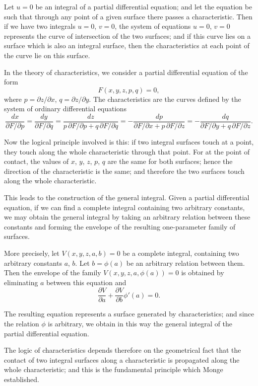 \documentclass[11pt,a4paper]{book}
\begin{document}
Let $u=0$ be an integral of a partial differential equation; and let the equation be such that through any point of a given surface there passes a characteristic. Then if we have two integrals $u=0$, $v=0$, the system of equations $u=0$, $v=0$ represents the curve of intersection of the two surfaces; and if this curve lies on a surface which is also an integral surface, then the characteristics at each point of the curve lie on this surface.

In the theory of characteristics, we consider a partial differential equation of the form
\[
F(x,y,z,p,q) = 0,
\]
where $p=\partial z/\partial x$, $q=\partial z/\partial y$. The characteristics are the curves defined by the system of ordinary differential equations
\[
\frac{dx}{\partial F/\partial p}
= \frac{dy}{\partial F/\partial q}
= \frac{dz}{p\,\partial F/\partial p + q\,\partial F/\partial q}
= -\frac{dp}{\partial F/\partial x + p\,\partial F/\partial z}
= -\frac{dq}{\partial F/\partial y + q\,\partial F/\partial z}.
\]

Now the logical principle involved is this: if two integral surfaces touch at a point, they touch along the whole characteristic through that point. For at the point of contact, the values of $x$, $y$, $z$, $p$, $q$ are the same for both surfaces; hence the direction of the characteristic is the same; and therefore the two surfaces touch along the whole characteristic.

This leads to the construction of the general integral. Given a partial differential equation, if we can find a complete integral containing two arbitrary constants, we may obtain the general integral by taking an arbitrary relation between these constants and forming the envelope of the resulting one-parameter family of surfaces.

More precisely, let $V(x,y,z,a,b)=0$ be a complete integral, containing two arbitrary constants $a$, $b$. Let $b=\phi(a)$ be an arbitrary relation between them. Then the envelope of the family $V(x,y,z,a,\phi(a))=0$ is obtained by eliminating $a$ between this equation and
\[
\frac{\partial V}{\partial a} + \frac{\partial V}{\partial b}\phi'(a) = 0.
\]

The resulting equation represents a surface generated by characteristics; and since the relation $\phi$ is arbitrary, we obtain in this way the general integral of the partial differential equation.

The logic of characteristics depends therefore on the geometrical fact that the contact of two integral surfaces along a characteristic is propagated along the whole characteristic; and this is the fundamental principle which Monge established.
\end{document}
